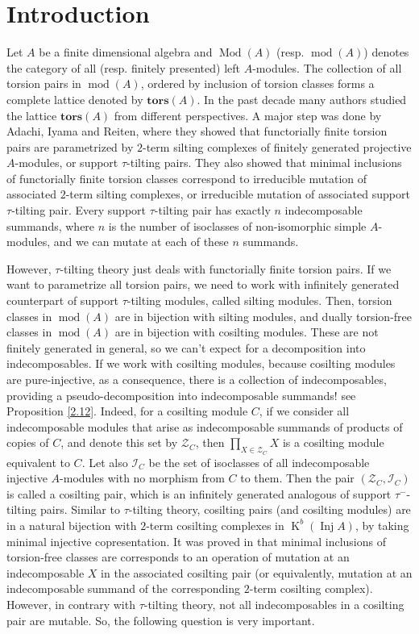 \documentclass[12pt]{amsart}
\numberwithin{equation}{section}
\theoremstyle{definition}
\DeclareMathOperator{\Mod}{Mod}
\DeclareMathOperator{\modd}{mod}
\DeclareMathOperator{\K}{K}
\DeclareMathOperator{\Inj}{Inj}
\newtheorem*{theorem 0*}{Theorem}
\newtheorem*{theorem a*}{Theorem A}
\newtheorem*{theorem b*}{Theorem B}
\numberwithin{diagram}{section}
\begin{document}
\section{Introduction}
Let $A$ be a finite dimensional algebra and $\Mod(A)$ (resp. $\modd(A)$) denotes the category of all (resp. finitely presented) left $A$-modules.
The collection of all torsion pairs in $\modd (A)$, ordered by inclusion of torsion classes forms a complete lattice denoted by $\textbf{tors}(A)$.
In the past decade many authors studied the lattice $\textbf{tors}(A)$ from different perspectives. A major step was done by Adachi, Iyama and Reiten, where they showed that functorially finite torsion pairs are parametrized by $2$-term silting complexes of finitely generated projective $A$-modules, or support $\tau$-tilting pairs. They also showed that minimal inclusions of functorially finite torsion classes correspond to irreducible mutation of associated $2$-term silting complexes, or irreducible mutation of associated support $\tau$-tilting pair. Every support $\tau$-tilting pair has exactly $n$ indecomposable summands, where $n$ is the number of isoclasses of non-isomorphic simple $A$-modules, and we can mutate at each of these $n$ summands.

However, $\tau$-tilting theory just deals with functorially finite torsion pairs.
If we want to parametrize all torsion pairs, we need to work with infinitely generated counterpart of support $\tau$-tilting modules, called silting modules. Then, torsion classes in $\modd (A)$ are in bijection with silting modules, and dually torsion-free classes in $\modd (A)$ are in bijection with cosilting modules. These are not finitely generated in general, so we can't expect for a decomposition into indecomposables. If we work with cosilting modules, because cosilting modules are pure-injective, as a consequence, there is a collection of indecomposables, providing a pseudo-decomposition into indecomposable summands! see Proposition \ref{2.12}.
Indeed, for a cosilting module $C$, if we consider all indecomposable modules that arise as indecomposable summands of products of copies of $C$, and denote this set by $\mathcal{Z}_C$, then $\prod_{X\in\mathcal{Z}_C} X$ is a cosilting module equivalent to $C$.
Let also $\mathcal{I}_C$ be the set of isoclasses of all indecomposable injective $A$-modules with no morphism from $C$ to them. Then the pair $(\mathcal{Z}_C, \mathcal{I}_C)$ is called a cosilting pair, which is an infinitely generated analogous of support $\tau^-$-tilting pairs.
Similar to $\tau$-tilting theory, cosilting pairs (and cosilting modules) are in a natural bijection with $2$-term cosilting complexes in $\K^b(\Inj A)$, by taking minimal injective copresentation.
It was proved in \cite{ALSV} that minimal inclusions of torsion-free classes are corresponds to an operation of mutation at an indecomposable $X$ in the associated cosilting pair (or equivalently, mutation at an indecomposable summand of the corresponding $2$-term cosilting complex). However, in contrary with $\tau$-tilting theory, not all indecomposables in a cosilting pair are mutable. So, the following question is very important.
\end{document}
